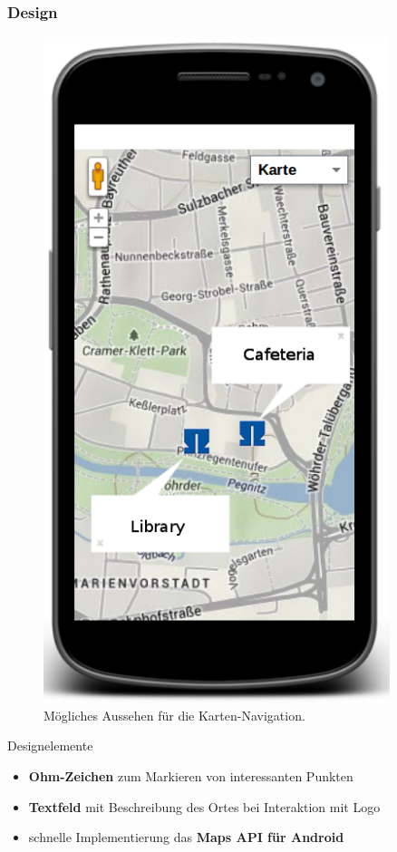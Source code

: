 \begin{frame}
\frametitle{Design}
	\begin{minipage}[c]{0.3\textwidth}
	\begin{figure}
		\includegraphics[width=0.9\textwidth]{../grafiken/map_gui.png}
		\caption{Mögliches Aussehen für die Karten-Navigation.}
	\end{figure} \vfill
	\end{minipage}
	\begin{minipage}[c]{0.65\textwidth}
	\begin{block}{Designelemente}
		\begin{itemize}
			\item \textbf{Ohm-Zeichen} zum Markieren von interessanten Punkten
			\item \textbf{Textfeld} mit Beschreibung des Ortes bei Interaktion mit Logo
			\item schnelle Implementierung das \textbf{Maps API für Android}
		\end{itemize}
	\end{block}
	\end{minipage}
\end{frame}